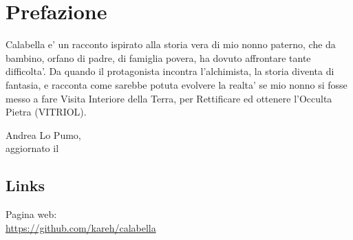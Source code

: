 \chapter{Prefazione}

Calabella e' un racconto ispirato alla storia vera di mio nonno paterno, che da bambino, orfano di padre, di famiglia povera, ha dovuto affrontare tante difficolta'. Da quando il protagonista incontra l'alchimista, la storia diventa di fantasia, e racconta come sarebbe potuta evolvere la realta' se mio nonno si fosse messo a fare Visita Interiore della Terra, per Rettificare ed ottenere l'Occulta Pietra (VITRIOL).

\begin{flushright}
    \vspace*{\fill}
    Andrea Lo Pumo, \finishDate\\
    aggiornato il \lastUpdateDate
\end{flushright}

\section{Links}

Pagina web:\\
\url{https://github.com/kareh/calabella}


